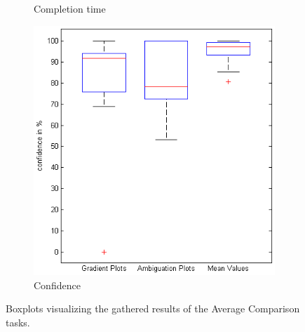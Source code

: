 \begin{figure}[H]
\begin{subfigure}[b]{0.32\textwidth}
        \caption{Completion time}
        \label{fig:s3_time}
    \end{subfigure}
		\begin{subfigure}[b]{0.32\textwidth}
        \includegraphics[width=\textwidth]{figures/boxplots/s3_confidence.png}
        \caption{Confidence}
        \label{fig:s3_confidence}
    \end{subfigure}
    \caption{Boxplots visualizing the gathered results of the Average Comparison tasks.}
		\label{fig:s3_boxplots}
\end{figure}

